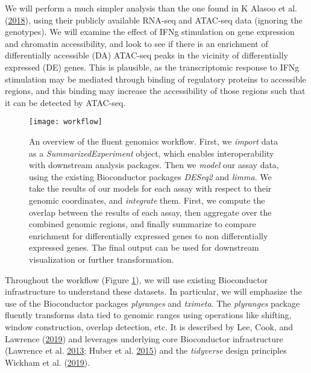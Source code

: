 \documentclass[
]{article}
\begin{document}
We will perform a much simpler analysis than the one found in K Alasoo et al. (\protect\hyperlink{ref-alasoo}{2018}), using
their publicly available RNA-seq and ATAC-seq data (ignoring the genotypes). We
will examine the effect of IFNg stimulation on gene expression and chromatin
accessibility, and look to see if there is an enrichment of differentially
accessible (DA) ATAC-seq peaks in the vicinity of differentially expressed (DE)
genes. This is plausible, as the transcriptomic response to IFNg stimulation
may be mediated through binding of regulatory proteins to accessible regions,
and this binding may increase the accessibility of those regions such that it
can be detected by ATAC-seq.

\begin{figure}

{\centering \texttt{[image: workflow]} 

}

\caption{An overview of the fluent genomics workflow. First, we \emph{import} data as a \emph{SummarizedExperiment} object, which enables interoperability with downstream analysis packages. Then we \emph{model} our assay data, using the existing Bioconductor packages \emph{DESeq2} and \emph{limma}. We take the results of our models for each assay with respect to their genomic coordinates, and \emph{integrate} them. First, we compute the overlap between the results of each assay, then aggregate over the combined genomic regions, and finally summarize to compare enrichment for differentially expressed genes to non differentially expressed genes. The final output can be used for downstream visualization or further transformation.}\label{fig:workflow}
\end{figure}

Throughout the workflow (Figure \ref{fig:workflow}), we will use existing
Bioconductor infrastructure to understand these datasets. In particular, we
will emphasize the use of the Bioconductor packages \emph{plyranges} and \emph{tximeta}.
The \emph{plyranges} package fluently transforms data tied to genomic ranges using
operations like shifting, window construction, overlap detection, etc. It is
described by Lee, Cook, and Lawrence (\protect\hyperlink{ref-Lee2019}{2019}) and leverages underlying core Bioconductor infrastructure
(Lawrence et al. \protect\hyperlink{ref-granges}{2013}; Huber et al. \protect\hyperlink{ref-bioc}{2015}) and the \emph{tidyverse} design principles Wickham et al. (\protect\hyperlink{ref-tidyverse}{2019}).
\end{document}
